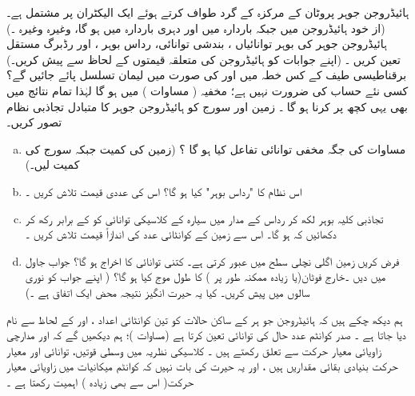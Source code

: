 ہائیڈروجن جوہر  پروٹان  کے مرکزہ کے گرد طواف کرتے ہوئے  ایک  الیکٹران  پر مشتمل  ہے۔(از  خود ہائیڈروجن  میں      جبکہ    باردارہ  میں   اور دہری باردارہ    میں    ہو گا،  وغیرہ وغیرہ ۔)   ہائیڈروجن  جوہر کی بوہر  توانائیاں  ،  بندشی  توانائی،   رداس بوہر  ،  اور رڈبرگ  مستقل  
 تعین کریں ۔ (اپنے جوابات کو  ہائیڈروجن  کی متعلقہ قیمتوں کے لحاظ سے پیش کریں۔)   برقناطیسی طیف کے کس خطہ میں   اور   کی صورت میں   لیمان   تسلسل پائے جائیں گے؟    کسی نئے   حساب کی ضرورت نہیں ہے؛   مخفیہ (  مساوات )   میں    ہو گا لہٰذا تمام  نتائج میں بھی یہی کچھ پر کرنا  ہو  گا  ۔
زمین اور سورج کو ہائیڈروجن  جوہر کا متبادل تجاذبی نظام تصور کریں۔
\begin{enumerate}[a.]
\item
 مساوات    کی جگہ مخفی توانائی تفاعل کیا  ہو گا ؟  (زمین کی کمیت   جبکہ سورج کی کمیت  لیں۔)
\item
اس نظام کا   "رداس بوہر"    کیا ہو گا؟ اس کی عددی قیمت تلاش کریں ۔
\item
تجاذبی کلیہ  بوہر  لکھ کر  رداس   کے مدار میں سیارہ  کے کلاسیکی توانائی کو   کے برابر رکھ کر  دکھائیں کہ  ہو گا۔ اس سے زمین کے کوانٹائی  عدد  کی اندازاً قیمت تلاش کریں ۔
\item
فرض کریں  زمین  اگلی نچلی سطح    میں عبور کرتی  ہے۔  کتنی توانائی  کا اخراج ہو گا؟  جواب   جاول   میں دیں ۔خارج   فوٹان(یا   زیادہ ممکنہ طور پر )   کا طول موج کیا ہو گا؟ ( اپنے جواب کو نوری سالوں میں پیش کریں۔ کیا یہ حیرت انگیز  نتیجہ محض ایک اتفاق ہے ۔)
\end{enumerate}

ہم دیکھ چکے ہیں کہ ہائیڈروجن جو ہر کے ساکن حالات کو تین کوانٹائی اعداد ،   اور  کے لحاظ سے نام دیا جاتا ہے ۔ صدر کوانٹم عدد   حال کی توانائی تعین کرتا ہے  (مساوات  )؛  ہم دیکھیں گے کہ  اور  مدارچی زاویائی معیار حرکت سے تعلق رکھتے ہیں ۔ کلاسیکی نظریہ میں وسطی قوتیں،  توانائی اور معیار حرکت بنیادی بقائی مقداریں ہیں ،  اور یہ حیرت کی  بات نہیں  کہ کوانٹم میکانیات میں  زاویائی معیار حرکت( اس سے بھی زیادہ ) اہمیت  رکھتا ہے ۔


